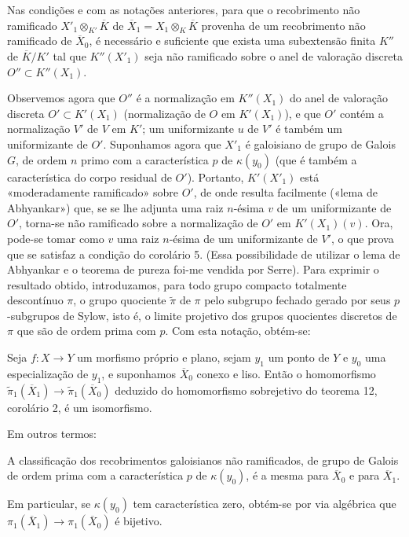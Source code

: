  Nas condições e com as notações anteriores, para
que o recobrimento não ramificado
$X'_1\otimes_{K'}\overline K$ de
$\overline X_1=X_1\otimes_K\overline K$ provenha de um recobrimento não
ramificado de $\overline X_0$, é necessário e suficiente que exista uma
subextensão finita $K''$ de $\overline K/K'$ tal que $K''(X'_1)$ seja não
ramificado sobre o anel de valoração discreta $O''\subset K''(X_1)$.

Observemos agora que $O''$ é a normalização em $K''(X_1)$ do anel de
valoração discreta $O'\subset K'(X_1)$ (normalização de $O$ em $K'(X_1)$), e
que $O'$ contém a normalização $V'$ de $V$ em $K'$; um uniformizante $u$ de
$V'$ é também um uniformizante de $O'$. Suponhamos agora que $X'_1$ é
galoisiano de grupo de Galois $G$, de ordem $n$ primo com a característica $p$
de $\kappa(y_0)$ (que é também a característica do corpo residual de
$O'$). Portanto, $K'(X'_1)$ está «moderadamente ramificado» sobre $O'$, de onde
resulta facilmente («lema de Abhyankar») que, se se lhe adjunta uma raiz
$n$-ésima $v$ de um uniformizante de $O'$, torna-se não ramificado sobre a
normalização de $O'$ em $K'(X_1)(v)$. Ora, pode-se tomar como $v$ uma
raiz $n$-ésima de um uniformizante de $V'$, o que prova que se satisfaz a
condição do corolário 5. (Essa possibilidade de utilizar o lema de Abhyankar e
o teorema de pureza foi-me vendida por Serre). Para exprimir o resultado
obtido, introduzamos, para todo grupo compacto totalmente descontínuo $\pi$,
o grupo quociente $\widetilde\pi$ de $\pi$ pelo subgrupo fechado gerado
por seus $p$-subgrupos de Sylow, isto é, o limite projetivo dos grupos
quocientes discretos de $\pi$ que são de ordem prima com $p$. Com esta notação,
obtém-se:

 Seja $f:X\longrightarrow Y$ um morfismo próprio e plano,
sejam $y_1$ um ponto de $Y$ e $y_0$ uma especialização de $y_1$, e suponhamos
$\overline X_0$ conexo e liso. Então o homomorfismo
$\widetilde\pi_1(\overline X_1)\longrightarrow
\widetilde\pi_1(\overline X_0)$ deduzido do homomorfismo sobrejetivo do
teorema 12, corolário 2, é um isomorfismo.

Em outros termos:

 A classificação dos recobrimentos galoisianos não
ramificados, de grupo de Galois de ordem prima com a característica $p$ de
$\kappa(y_0)$, é a mesma para $\overline X_0$ e para $\overline X_1$.

Em particular, se $\kappa(y_0)$ tem característica zero, obtém-se por via
algébrica que $\pi_1(\overline X_1)\longrightarrow\pi_1(\overline X_0)$ é
bijetivo.

